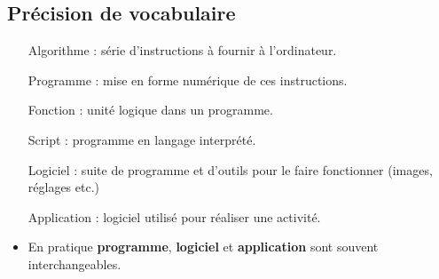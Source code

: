 \subsection{Précision de vocabulaire}
\begin{slide}
	\small
	\begin{itemize}
		\item[Algorithme] : série d'instructions à fournir à l'ordinateur.
		\item[Programme] : mise en forme numérique de ces instructions. 
		\item[Fonction] : unité logique dans un programme.
		\item[Script] : programme en langage interprété.
		\item[Logiciel] : suite de programme et d'outils pour le faire fonctionner (images, réglages etc.)
		\item[Application] : logiciel utilisé pour réaliser une activité.
		\item En pratique \textbf{programme}, \textbf{logiciel} et \textbf{application} sont souvent interchangeables.
	\end{itemize}
\end{slide}